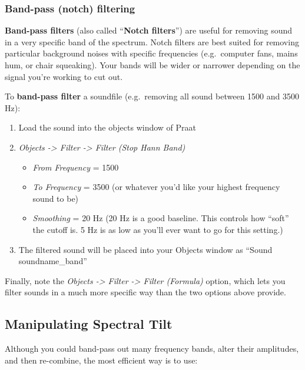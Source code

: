\documentclass[11pt]{article}
\def\tightlist{}
\begin{document}
\hypertarget{band-pass-notch-filtering}{%
\subsubsection{Band-pass (notch)
filtering}\label{band-pass-notch-filtering}}

\textbf{Band-pass filters} (also called ``\textbf{Notch filters}'') are
useful for removing sound in a very specific band of the spectrum. Notch
filters are best suited for removing particular background noises with
specific frequencies (e.g.~computer fans, mains hum, or chair
squeaking). Your bands will be wider or narrower depending on the signal
you're working to cut out.

To \textbf{band-pass filter} a soundfile (e.g.~removing all sound
between 1500 and 3500 Hz):

\begin{enumerate}
\def\labelenumi{\arabic{enumi}.}
\tightlist
\item
  Load the sound into the objects window of Praat
\item
  \emph{Objects -\textgreater{} Filter -\textgreater{} Filter (Stop Hann
  Band)}

  \begin{itemize}
  \tightlist
  \item
    \emph{From Frequency} = 1500
  \item
    \emph{To Frequency} = 3500 (or whatever you'd like your highest
    frequency sound to be)
  \item
    \emph{Smoothing} = 20 Hz (20 Hz is a good baseline. This controls
    how ``soft'' the cutoff is. 5 Hz is as low as you'll ever want to go
    for this setting.)
  \end{itemize}
\item
  The filtered sound will be placed into your Objects window as ``Sound
  soundname\_band''
\end{enumerate}

Finally, note the \emph{Objects -\textgreater{} Filter -\textgreater{}
Filter (Formula)} option, which lets you filter sounds in a much more
specific way than the two options above provide.

\hypertarget{manipulating-spectral-tilt}{%
\subsection{Manipulating Spectral
Tilt}\label{manipulating-spectral-tilt}}

Although you could band-pass out many frequency bands, alter their
amplitudes, and then re-combine, the most efficient way is to use:
\end{document}
